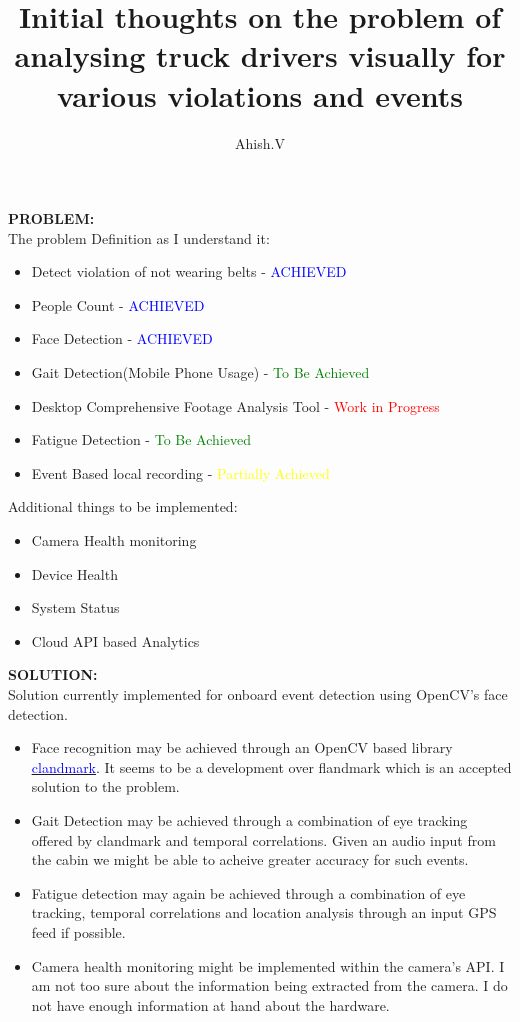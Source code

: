 \documentclass{article}
\begin{document}
\title{Initial thoughts on the problem of analysing truck drivers visually for various violations and events}
\author{Ahish.V}
\maketitle
\textbf{PROBLEM:} \\
    The problem Definition as I understand it:
    \begin{itemize}
       \item Detect violation of not wearing belts - \textcolor{blue}{ACHIEVED}
       \item People Count - \textcolor{blue}{ACHIEVED}
       \item Face Detection - \textcolor{blue}{ACHIEVED}
       \item Gait Detection(Mobile Phone Usage) - \textcolor{green}{To Be Achieved}
       \item Desktop Comprehensive Footage Analysis Tool - \textcolor{red}{Work in Progress}
       \item Fatigue Detection - \textcolor{green}{To Be Achieved}
       \item Event Based local recording - \textcolor{yellow}{Partially Achieved} 
    \end{itemize}
    Additional things to be implemented:
    \begin{itemize}
        \item Camera Health monitoring
        \item Device Health
        \item System Status
        \item Cloud API based Analytics
    \end{itemize}
\textbf{SOLUTION:} \\
    Solution currently implemented for onboard event detection using OpenCV's face detection.
    \begin{itemize}
        \item Face recognition may be achieved through an OpenCV based library 
        \href{https://github.com/uricamic/clandmark}{\underline{\textcolor{blue}{clandmark}}}. 
        It seems to be a development over flandmark which is an accepted solution to the problem. 
        \item Gait Detection may be achieved through a combination of eye tracking offered by clandmark
        and temporal correlations. Given an audio input from the cabin we might be able to acheive greater 
        accuracy for such events.
        \item Fatigue detection may again be achieved through a combination of eye tracking, temporal correlations
        and location analysis through an input GPS feed if possible. 
        \item Camera health monitoring might be implemented within the camera's API. I am not too sure about the
        information being extracted from the camera. I do not have enough information at hand about the hardware.
    \end{itemize} 
\end{document}
